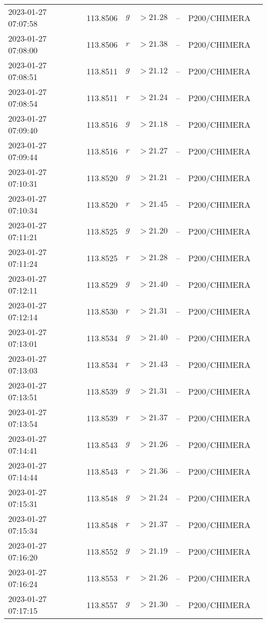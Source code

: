 \documentclass{nature_plusfigure}
\begin{document}
\begin{supplement}
\begin{center}
\begin{longtable}{lllllll}
2023-01-27 07:07:58 & 113.8506 & $g$ & $>21.28$ & -- & P200/CHIMERA &  \\ 
2023-01-27 07:08:00 & 113.8506 & $r$ & $>21.38$ & -- & P200/CHIMERA &  \\ 
2023-01-27 07:08:51 & 113.8511 & $g$ & $>21.12$ & -- & P200/CHIMERA &  \\ 
2023-01-27 07:08:54 & 113.8511 & $r$ & $>21.24$ & -- & P200/CHIMERA &  \\ 
2023-01-27 07:09:40 & 113.8516 & $g$ & $>21.18$ & -- & P200/CHIMERA &  \\ 
2023-01-27 07:09:44 & 113.8516 & $r$ & $>21.27$ & -- & P200/CHIMERA &  \\ 
2023-01-27 07:10:31 & 113.8520 & $g$ & $>21.21$ & -- & P200/CHIMERA &  \\ 
2023-01-27 07:10:34 & 113.8520 & $r$ & $>21.45$ & -- & P200/CHIMERA &  \\ 
2023-01-27 07:11:21 & 113.8525 & $g$ & $>21.20$ & -- & P200/CHIMERA &  \\ 
2023-01-27 07:11:24 & 113.8525 & $r$ & $>21.28$ & -- & P200/CHIMERA &  \\ 
2023-01-27 07:12:11 & 113.8529 & $g$ & $>21.40$ & -- & P200/CHIMERA &  \\ 
2023-01-27 07:12:14 & 113.8530 & $r$ & $>21.31$ & -- & P200/CHIMERA &  \\ 
2023-01-27 07:13:01 & 113.8534 & $g$ & $>21.40$ & -- & P200/CHIMERA &  \\ 
2023-01-27 07:13:03 & 113.8534 & $r$ & $>21.43$ & -- & P200/CHIMERA &  \\ 
2023-01-27 07:13:51 & 113.8539 & $g$ & $>21.31$ & -- & P200/CHIMERA &  \\ 
2023-01-27 07:13:54 & 113.8539 & $r$ & $>21.37$ & -- & P200/CHIMERA &  \\ 
2023-01-27 07:14:41 & 113.8543 & $g$ & $>21.26$ & -- & P200/CHIMERA &  \\ 
2023-01-27 07:14:44 & 113.8543 & $r$ & $>21.36$ & -- & P200/CHIMERA &  \\ 
2023-01-27 07:15:31 & 113.8548 & $g$ & $>21.24$ & -- & P200/CHIMERA &  \\ 
2023-01-27 07:15:34 & 113.8548 & $r$ & $>21.37$ & -- & P200/CHIMERA &  \\ 
2023-01-27 07:16:20 & 113.8552 & $g$ & $>21.19$ & -- & P200/CHIMERA &  \\ 
2023-01-27 07:16:24 & 113.8553 & $r$ & $>21.26$ & -- & P200/CHIMERA &  \\ 
2023-01-27 07:17:15 & 113.8557 & $g$ & $>21.30$ & -- & P200/CHIMERA &  \\ 

\end{longtable}
\end{center}
\end{supplement}
\end{document}

